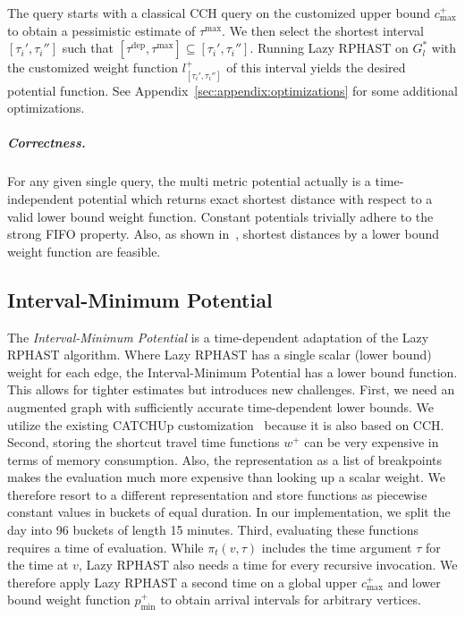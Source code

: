 \documentclass[a4paper,UKenglish,cleveref, autoref, thm-restate,anonymous]{lipics-v2021}
\newcommand*{\pred}{p}
\newcommand*{\comb}{c}
\newcommand*{\tdep}{\tau^{\operatorname{dep}}}
\newcommand*{\tmax}{\tau^{\max}}
\begin{document}
The query starts with a classical CCH query on the customized upper bound $\comb^+_{\max}$ to obtain a pessimistic estimate of $\tmax$.
We then select the shortest interval $[\tau_i', \tau_i'']$ such that $[\tdep,\tmax] \subseteq [\tau_i', \tau_i'']$.
Running Lazy RPHAST on $G^*_l$ with the customized weight function $l_{[\tau_i', \tau_i'']}^+$ of this interval yields the desired potential function.
See Appendix~\ref{sec:appendix:optimizations} for some additional optimizations.

\subparagraph{Correctness.}
For any given single query, the multi metric potential actually is a time-independent potential which returns exact shortest distance with respect to a valid lower bound weight function.
Constant potentials trivially adhere to the strong FIFO property.
Also, as shown in~\cite{strasser_et_al:LIPIcs.SEA.2021.6}, shortest distances by a lower bound weight function are feasible.

\subsection{Interval-Minimum Potential}

The \emph{Interval-Minimum Potential} is a time-dependent adaptation of the Lazy RPHAST algorithm.
Where Lazy RPHAST has a single scalar (lower bound) weight for each edge, the Interval-Minimum Potential has a lower bound function.
This allows for tighter estimates but introduces new challenges.
First, we need an augmented graph with sufficiently accurate time-dependent lower bounds.
We utilize the existing CATCHUp customization~\cite{swz-sfert-21} because it is also based on CCH.
Second, storing the shortcut travel time functions $w^+$ can be very expensive in terms of memory consumption.
Also, the representation as a list of breakpoints makes the evaluation much more expensive than looking up a scalar weight.
We therefore resort to a different representation and store functions as piecewise constant values in buckets of equal duration.
In our implementation, we split the day into 96 buckets of length 15 minutes.
Third, evaluating these functions requires a time of evaluation.
While $\pi_t(v, \tau)$ includes the time argument $\tau$ for the time at $v$, Lazy RPHAST also needs a time for every recursive invocation.
We therefore apply Lazy RPHAST a second time on a global upper $\comb_{\max}^+$ and lower bound weight function $\pred_{\min}^+$ to obtain arrival intervals for arbitrary vertices.
\end{document}
